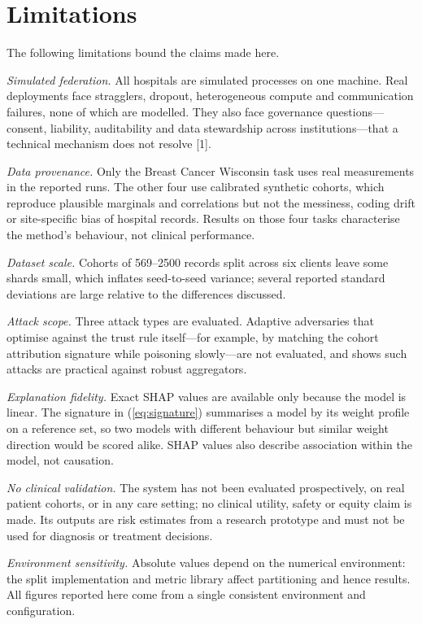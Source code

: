 \documentclass[10pt,twocolumn,letterpaper]{article}
\begin{document}
\section{Limitations}
\label{sec:limits}

The following limitations bound the claims made here.

\emph{Simulated federation.} All hospitals are simulated processes on one
machine. Real deployments face stragglers, dropout, heterogeneous compute and
communication failures, none of which are modelled. They also face governance
questions---consent, liability, auditability and data stewardship across
institutions---that a technical mechanism does not resolve
[1].

\emph{Data provenance.} Only the Breast Cancer Wisconsin task uses real
measurements in the reported runs. The other four use calibrated synthetic
cohorts, which reproduce plausible marginals and correlations but not the
messiness, coding drift or site-specific bias of hospital records. Results on
those four tasks characterise the method's behaviour, not clinical
performance.

\emph{Dataset scale.} Cohorts of 569--2500 records split across six clients
leave some shards small, which inflates seed-to-seed variance; several
reported standard deviations are large relative to the differences discussed.

\emph{Attack scope.} Three attack types are evaluated. Adaptive adversaries
that optimise against the trust rule itself---for example, by matching the
cohort attribution signature while poisoning slowly---are not evaluated, and
 shows such attacks are practical against robust aggregators.

\emph{Explanation fidelity.} Exact SHAP values are available only because
the model is linear. The signature in (\ref{eq:signature}) summarises a model
by its weight profile on a reference set, so two models with different
behaviour but similar weight direction would be scored alike. SHAP values
also describe association within the model, not causation.

\emph{No clinical validation.} The system has not been evaluated
prospectively, on real patient cohorts, or in any care setting; no clinical
utility, safety or equity claim is made. Its outputs are risk estimates from
a research prototype and must not be used for diagnosis or treatment
decisions.

\emph{Environment sensitivity.} Absolute values depend on the numerical
environment: the split implementation and metric library affect partitioning
and hence results. All figures reported here come from a single consistent
environment and configuration.
\end{document}
